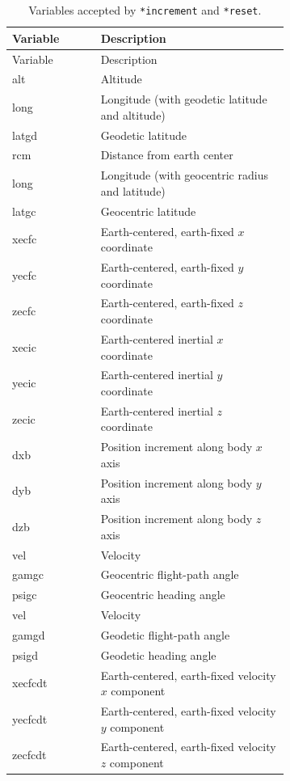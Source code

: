 \begin{longtable}{@{}>{\ttfamily}lp{0.68\linewidth}@{}}
  \caption{Variables accepted by \texttt{*increment} and \texttt{*reset}.}
  \label{tab:increment-variables}\\
  \toprule
  \normalfont Variable & Description \\
  \midrule
  \endfirsthead
  \toprule
  \normalfont Variable & Description \\
  \midrule
  \endhead
  alt       & Altitude \\
  long      & Longitude (with geodetic latitude and altitude) \\
  latgd     & Geodetic latitude \\
  rcm       & Distance from earth center \\
  long      & Longitude (with geocentric radius and latitude) \\
  latgc     & Geocentric latitude \\
  xecfc     & Earth-centered, earth-fixed $x$ coordinate \\
  yecfc     & Earth-centered, earth-fixed $y$ coordinate \\
  zecfc     & Earth-centered, earth-fixed $z$ coordinate \\
  xecic     & Earth-centered inertial $x$ coordinate \\
  yecic     & Earth-centered inertial $y$ coordinate \\
  zecic     & Earth-centered inertial $z$ coordinate \\
  dxb       & Position increment along body $x$ axis \\
  dyb       & Position increment along body $y$ axis \\
  dzb       & Position increment along body $z$ axis \\
  vel       & Velocity \\
  gamgc     & Geocentric flight-path angle \\
  psigc     & Geocentric heading angle \\
  vel       & Velocity \\
  gamgd     & Geodetic flight-path angle \\
  psigd     & Geodetic heading angle \\
  xecfcdt   & Earth-centered, earth-fixed velocity $x$ component \\
  yecfcdt   & Earth-centered, earth-fixed velocity $y$ component \\
  zecfcdt   & Earth-centered, earth-fixed velocity $z$ component \\

\end{longtable}
